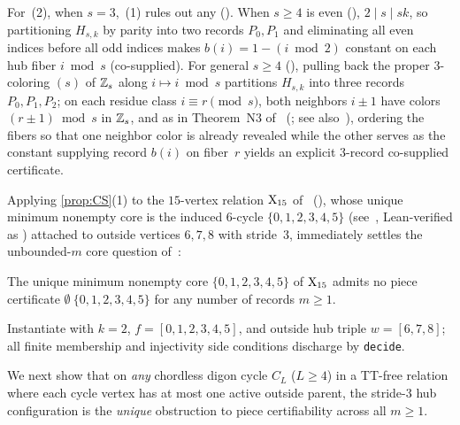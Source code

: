 \begin{outline}
For~(2), when $s = 3$,~(1) rules out any  (). When $s \ge 4$ is
even (), $2 \mid s \mid sk$, so partitioning $H_{s,k}$ by parity into two records $P_0,
P_1$ and eliminating all even indices before all odd indices makes $b(i) = 1 - (i \bmod 2)$ constant on each hub fiber
$i \bmod s$ (co-supplied). For general $s \ge 4$ (), pulling back the proper $3$-coloring
$(s)$ of $\mathbb{Z}_s$ along $i \mapsto i \bmod s$ partitions $H_{s,k}$ into three records $P_0, P_1, P_2$;
on each residue class $i \equiv r \pmod s$, both neighbors $i \pm 1$ have colors $(r \pm 1) \bmod s$ in $\mathbb{Z}_s$, and as in
Theorem~N3 of~\cite[Theorem~4.3]{SeventhPaper2026} (; see also~\cite[Lemma~5.7(b)]{SeventhPaper2026}),
ordering the fibers so that one neighbor color is already revealed while the other serves as the constant supplying record
$b(i)$ on fiber~$r$ yields an explicit $3$-record co-supplied certificate.
\end{outline}

Applying \cref{prop:CS}(1) to the $15$-vertex relation $\mathrm{X}_{15}$ of~\cite[Section~7.2, Remark~7.3]{SeventhPaper2026} (),
whose unique minimum nonempty core is the induced $6$-cycle $\{0,1,2,3,4,5\}$ (see~\cite[Remark~7.3]{SeventhPaper2026},
Lean-verified as ) attached to outside vertices $6, 7, 8$ with stride~$3$, immediately settles
the unbounded-$m$ core question of~\cite[Remark~7.3; Section~9.2, item~6]{SeventhPaper2026}:

\begin{corollary}\label{cor:x15}
The unique minimum nonempty core $\{0, 1, 2, 3, 4, 5\}$ of $\mathrm{X}_{15}$ admits no piece certificate
  $\emptyset\ \{0,1,2,3,4,5\}$ for any number of records $m \ge 1$.
\end{corollary}

\begin{outline}
Instantiate  with $k = 2$, $f = [0,1,2,3,4,5]$, and outside hub triple $w = [6,7,8]$; all
finite membership and injectivity side conditions discharge by \texttt{decide}.
\end{outline}

We next show that on \emph{any} chordless digon cycle $C_L$ ($L \ge 4$) in a TT-free relation where each cycle vertex has
at most one active outside parent, the stride-$3$ hub configuration is the \emph{unique} obstruction to piece
certifiability across all $m \ge 1$.

